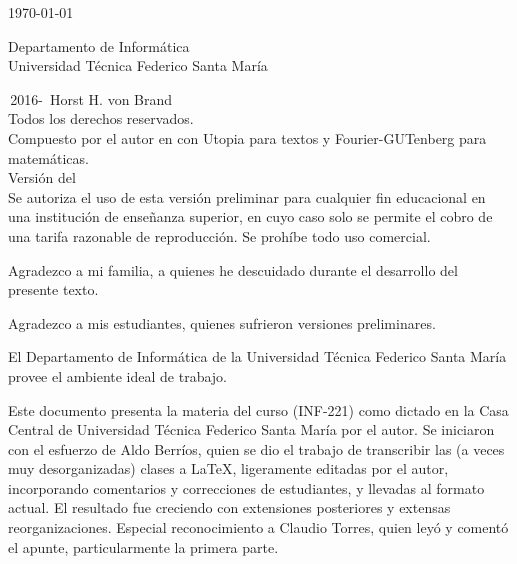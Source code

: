 \documentclass[czech, english, german, french, latin, spanish, fleqn]
              {memoir}
\theoremstyle{plain}
\theoremstyle{definition}
\theoremstyle{remark}
\begin{document}
\begin{center}
  \today
  \vspace*{2\baselineskip}

  {\large\sffamily
   Departamento de Informática\\
   Universidad Técnica Federico Santa María
  }
\end{center}

\clearpage



\thispagestyle{empty}
\vspace*{2ex}
\begin{small}
  \noindent
  \textcopyright\,2016-\the\year\ Horst H. von Brand \\
  Todos los derechos reservados.\\[1.2em]
  Compuesto por el autor en \LaTeXe{} con Utopia para textos
  y Fourier-GUTenberg para matemáticas.\\[2em]
  Versión {\classversion} del {\classdate} \\[0.7em]
  Se autoriza el uso de esta versión preliminar
  para cualquier fin educacional
  en una institución de enseñanza superior,
  en cuyo caso solo se permite
  el cobro de una tarifa razonable de reproducción.
  Se prohíbe todo uso comercial.
\end{small}

\cleardoublepage


\thispagestyle{empty}
\vspace*{\fill}
\vspace*{\fill}
\noindent
  Agradezco a mi familia,
  a quienes he descuidado
  durante el desarrollo del presente texto.

\noindent
  Agradezco a mis estudiantes,
  quienes sufrieron versiones preliminares.

\vspace*{\baselineskip}
\noindent
  El Departamento de Informática
  de la Universidad Técnica Federico Santa María
  provee el ambiente ideal de trabajo.

\vspace*{\baselineskip}
\noindent
  Este documento presenta
  la materia del curso  (INF-221)
  como dictado en la Casa Central de Universidad Técnica Federico Santa María
  por el autor.
  Se iniciaron con el esfuerzo de Aldo Berríos,
  quien se dio el trabajo de transcribir las
  (a veces muy desorganizadas)
  clases a \LaTeX,
  ligeramente editadas por el autor,
  incorporando comentarios y correcciones de estudiantes,
  y llevadas al formato actual.
  El resultado fue creciendo con extensiones posteriores
  y extensas reorganizaciones.
\vspace*{\baselineskip}
\noindent
  Especial reconocimiento a Claudio Torres,
  quien leyó y comentó el apunte,
  particularmente la primera parte.
\vspace*{\fill}
\end{document}
